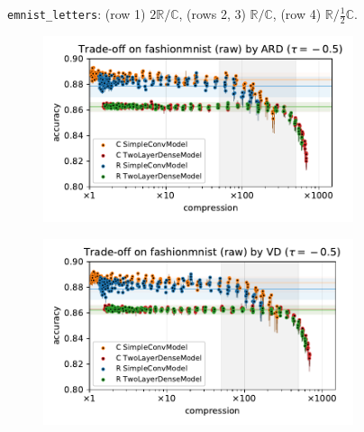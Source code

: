 \documentclass[a4paper,10pt,onecolumn]{article}
\newcommand{\real}{\mathbb{R}}
\newcommand{\cplx}{\mathbb{C}}
\begin{document}
\begin{figure}[b]
\begin{subfigure}[b]{0.5\columnwidth}
  \end{subfigure}
  \caption{%
    \texttt{emnist\_letters}: (row 1) $2\real / \cplx$, (rows 2, 3) $\real / \cplx$, (row 4) $\real / \tfrac12\cplx$.
  }
\end{figure}

\begin{figure}[b]
  \centering
  \begin{subfigure}[b]{0.5\columnwidth}
    \centering
    \includegraphics[width=\columnwidth]{figure__mnist-like__trade-off/appendix__ARD__fashionmnist__raw__-0.5.pdf}
  \end{subfigure}%
  \begin{subfigure}[b]{0.5\columnwidth}
    \centering
    \includegraphics[width=\columnwidth]{figure__mnist-like__trade-off/appendix__VD__fashionmnist__raw__-0.5.pdf}
  \end{subfigure} \\ %
  \begin{subfigure}[b]{0.5\columnwidth}

\end{subfigure}
\end{figure}
\end{document}
